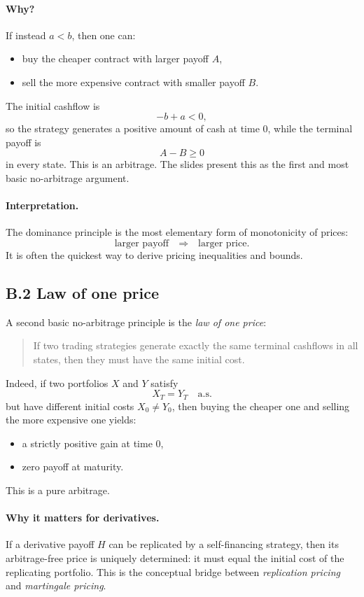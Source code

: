 \documentclass[11pt]{article}
\newcommand{\1}{\mathbf{1}}
\begin{document}
\paragraph{Why?}
If instead \(a<b\), then one can:
\begin{itemize}[leftmargin=1.4em]
    \item buy the cheaper contract with larger payoff \(A\),
    \item sell the more expensive contract with smaller payoff \(B\).
\end{itemize}
The initial cashflow is
$$
-b+a<0,
$$
so the strategy generates a positive amount of cash at time \(0\),
while the terminal payoff is
$$
A-B\ge 0
$$
in every state.
This is an arbitrage. The slides present this as the first and most basic no-arbitrage argument. 
\paragraph{Interpretation.}
The dominance principle is the most elementary form of monotonicity of prices:
$$
\text{larger payoff} \quad \Longrightarrow \quad \text{larger price.}
$$
It is often the quickest way to derive pricing inequalities and bounds.

\subsection*{B.2 Law of one price}

A second basic no-arbitrage principle is the \emph{law of one price}:

\begin{quote}
If two trading strategies generate exactly the same terminal cashflows in all states,
then they must have the same initial cost.
\end{quote}

Indeed, if two portfolios \(X\) and \(Y\) satisfy
$$
X_T=Y_T \quad \text{a.s.}
$$
but have different initial costs \(X_0\neq Y_0\), then buying the cheaper one and selling the more expensive one yields:
\begin{itemize}[leftmargin=1.4em]
    \item a strictly positive gain at time \(0\),
    \item zero payoff at maturity.
\end{itemize}
This is a pure arbitrage.

\paragraph{Why it matters for derivatives.}
If a derivative payoff \(H\) can be replicated by a self-financing strategy,
then its arbitrage-free price is uniquely determined:
it must equal the initial cost of the replicating portfolio.
This is the conceptual bridge between \emph{replication pricing} and \emph{martingale pricing}.
\end{document}
